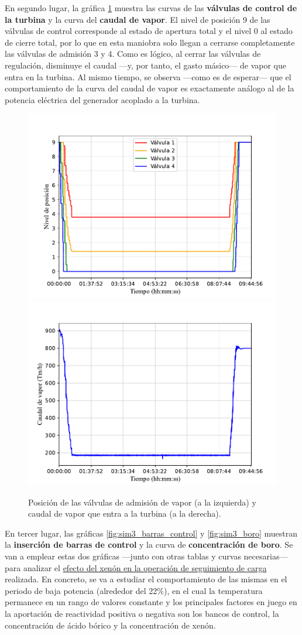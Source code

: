 En segundo lugar, la gráfica \ref{fig:image2} muestra las curvas de las \textbf{válvulas de control de la turbina} y la curva del \textbf{caudal de vapor}. El nivel de posición 9 de las válvulas de control corresponde al estado de apertura total y el nivel 0 al estado de cierre total, por lo que en esta maniobra solo llegan a cerrarse completamente las válvulas de admisión 3 y 4. Como es lógico, al cerrar las válvulas de regulación, disminuye el caudal ---y, por tanto, el gasto másico--- de vapor que entra en la turbina. Al mismo tiempo, se observa ---como es de esperar--- que el comportamiento de la curva del caudal de vapor es exactamente análogo al de la potencia eléctrica del generador acoplado a la turbina.

\begin{figure}[h]
  \includegraphics[width=0.5\linewidth]{content/figures/sim3_valvulas_control.pdf} 
  \includegraphics[width=0.5\linewidth]{content/figures/sim3_vapor.pdf}
  \caption{Posición de las válvulas de admisión de vapor (a la izquierda) y caudal de vapor que entra a la turbina (a la derecha).}
  \label{fig:image2}
\end{figure}

En tercer lugar, las gráficas \ref{fig:sim3_barras_control} y \ref{fig:sim3_boro} muestran la \textbf{inserción de barras de control} y la curva de \textbf{concentración de boro}. Se van a emplear estas dos gráficas ---junto con otras tablas y curvas necesarias--- para analizar el \underline{efecto del xenón en la operación de seguimiento de carga} realizada. En concreto, se va a estudiar el comportamiento de las mismas en el periodo de baja potencia (alrededor del 22\%), en el cual la temperatura permanece en un rango de valores constante y los principales factores en juego en la aportación de reactividad positiva o negativa son los bancos de control, la concentración de ácido bórico y la concentración de xenón.

